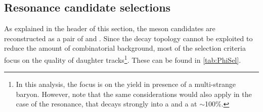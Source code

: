 \subsection{Resonance candidate selections}
\label{subsec:ResonanceSelections}

As explained in the header of this section, the \rmPhiMes meson candidates are reconstructed as a pair of \rmKplus and \rmKminus. Since the decay topology cannot be exploited to reduce the amount of combinatorial background, most of the selection criteria focus on the quality of daughter tracks\footnote{In this analysis, the focus is on the \rmPhiMes yield in presence of a multi-strange baryon. However, note that the same considerations would also apply in the case of the \rmKstarZero resonance, that decays strongly into a \rmKPM and a \rmPiPM at $\sim$100\%.}. These can be found in \tab\ref{tab:PhiSel}.

